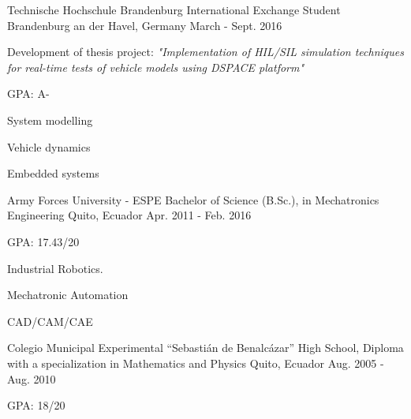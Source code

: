 
\begin{cventries}

  \cventry
    {Technische Hochschule Brandenburg}
    {International Exchange Student}
    {Brandenburg an der Havel, Germany}
    {March - Sept. 2016}
    {
      \begin{cvitems}
      	\item {Development of thesis project: \textit{"Implementation of HIL/SIL simulation techniques for real-time tests of vehicle models using DSPACE platform"}}
      	\item {GPA: A-}
        \item {System modelling}
        \item {Vehicle dynamics}
        \item {Embedded systems}
      \end{cvitems}
    }

  \cventry
    {Army Forces University - ESPE}
    {Bachelor of Science (B.Sc.), in Mechatronics Engineering}
    {Quito, Ecuador}
    {Apr. 2011 - Feb. 2016}
    {
      \begin{cvitems}
        \item {GPA: 17.43/20 }
        \item {Industrial Robotics.}
        \item {Mechatronic Automation}
        \item {CAD/CAM/CAE}
      \end{cvitems}
    }
    
  \cventry
    {Colegio Municipal Experimental “Sebastián de Benalcázar”}
    {High School, Diploma with a specialization in Mathematics and Physics}
    {Quito, Ecuador}
    {Aug. 2005 - Aug. 2010}
    {
      \begin{cvitems}
        \item {GPA: 18/20 }
      \end{cvitems}
    }
    
\end{cventries}
